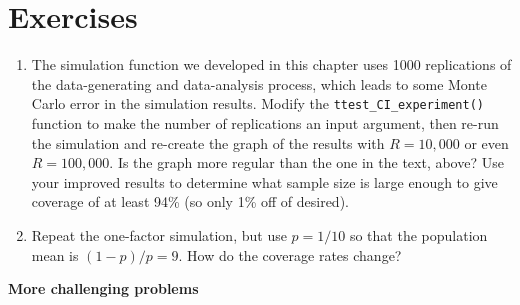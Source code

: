 \documentclass[
]{book}
\begin{document}
\section{Exercises}\label{exercises}

\begin{enumerate}
\def\labelenumi{\arabic{enumi}.}
\item
  The simulation function we developed in this chapter uses 1000 replications of the data-generating and data-analysis process, which leads to some Monte Carlo error in the simulation results. Modify the \texttt{ttest\_CI\_experiment()} function to make the number of replications an input argument, then re-run the simulation and re-create the graph of the results with \(R=10,000\) or even \(R=100,000\). Is the graph more regular than the one in the text, above?
  Use your improved results to determine what sample size is large enough to give coverage of at least 94\% (so only 1\% off of desired).
\item
  Repeat the one-factor simulation, but use \(p = 1/10\) so that the population mean is \((1 - p) / p = 9\). How do the coverage rates change?
\end{enumerate}

\textbf{More challenging problems}
\end{document}
